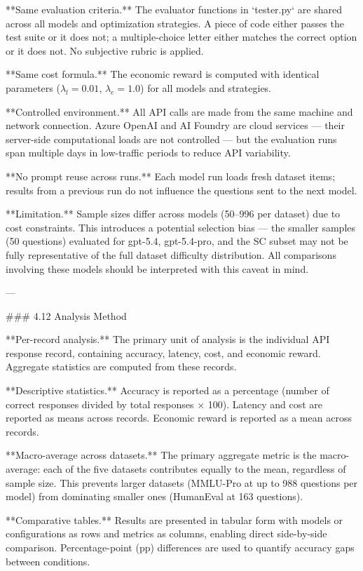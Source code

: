 **Same evaluation criteria.** The evaluator functions in `tester.py` are shared across all models and optimization strategies. A piece of code either passes the test suite or it does not; a multiple-choice letter either matches the correct option or it does not. No subjective rubric is applied.

**Same cost formula.** The economic reward is computed with identical parameters ($\lambda_l = 0.01$, $\lambda_e = 1.0$) for all models and strategies.

**Controlled environment.** All API calls are made from the same machine and network connection. Azure OpenAI and AI Foundry are cloud services — their server-side computational loads are not controlled — but the evaluation runs span multiple days in low-traffic periods to reduce API variability.

**No prompt reuse across runs.** Each model run loads fresh dataset items; results from a previous run do not influence the questions sent to the next model.

**Limitation.** Sample sizes differ across models (50–996 per dataset) due to cost constraints. This introduces a potential selection bias — the smaller samples (50 questions) evaluated for gpt-5.4, gpt-5.4-pro, and the SC subset may not be fully representative of the full dataset difficulty distribution. All comparisons involving these models should be interpreted with this caveat in mind.

---

### 4.12 Analysis Method

**Per-record analysis.** The primary unit of analysis is the individual API response record, containing accuracy, latency, cost, and economic reward. Aggregate statistics are computed from these records.

**Descriptive statistics.** Accuracy is reported as a percentage (number of correct responses divided by total responses × 100). Latency and cost are reported as means across records. Economic reward is reported as a mean across records.

**Macro-average across datasets.** The primary aggregate metric is the macro-average: each of the five datasets contributes equally to the mean, regardless of sample size. This prevents larger datasets (MMLU-Pro at up to 988 questions per model) from dominating smaller ones (HumanEval at 163 questions).

**Comparative tables.** Results are presented in tabular form with models or configurations as rows and metrics as columns, enabling direct side-by-side comparison. Percentage-point (pp) differences are used to quantify accuracy gaps between conditions.

